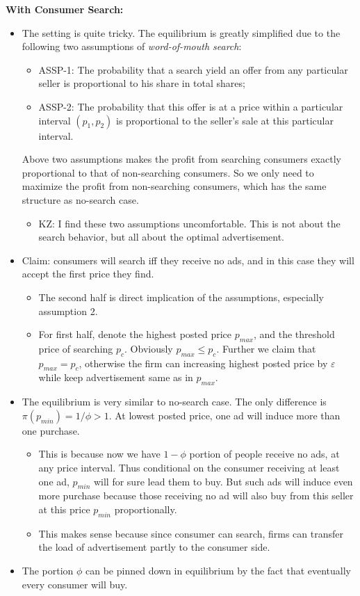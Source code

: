 \documentclass{book}
\theoremstyle{plain}
\theoremstyle{definition}
\begin{document}
\vspace{1em}
\noindent
\textbf{With Consumer Search:}
\begin{itemize}
	\item The setting is quite tricky. The equilibrium is greatly simplified due to the following two assumptions of \textit{word-of-mouth search}:
	\begin{itemize}
		\item ASSP-1: The probability that a search yield an offer from any particular seller is proportional to his share in total shares;
		\item ASSP-2: The probability that this offer is at a price within a particular interval $(p_1,p_2)$ is proportional to the seller's sale at this particular interval.
	\end{itemize}
	Above two assumptions makes the profit from searching consumers exactly proportional to that of non-searching consumers. So we only need to maximize the profit from non-searching consumers, which has the same structure as no-search case.
	\begin{itemize}
		\item KZ: I find these two assumptions uncomfortable. This is not about the search behavior, but all about the optimal advertisement.
	\end{itemize}

	\item Claim: consumers will search iff they receive no ads, and in this case they will accept the first price they find.
	\begin{itemize}
		\item The second half is direct implication of the assumptions, especially assumption 2.
		\item For first half, denote the highest posted price $p_{max}$, and the threshold price of searching $p_c$. Obviously $p_{max}\leq p_c$. Further we claim that $p_{max}=p_c$, otherwise the firm can increasing highest posted price by $\varepsilon$ while keep advertisement same as in $p_{max}$.
	\end{itemize}

	\item The equilibrium is very similar to no-search case. The only difference is $\pi(p_{min})=1/\phi>1$. At lowest posted price, one ad will induce more than one purchase.
	\begin{itemize}
		\item This is because now we have $1-\phi$ portion of people receive no ads, at any price interval. Thus conditional on the consumer receiving at least one ad, $p_{min}$ will for sure lead them to buy. But such ads will induce even more purchase because those receiving no ad will also buy from this seller at this price $p_{min}$ proportionally.
		\item This makes sense because since consumer can search, firms can transfer the load of advertisement partly to the consumer side.
	\end{itemize}

	\item The portion $\phi$ can be pinned down in equilibrium by the fact that eventually every consumer will buy.
\end{itemize}
\end{document}
